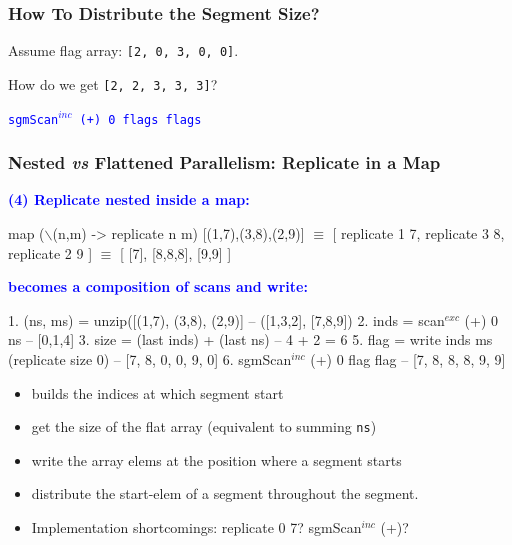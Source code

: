 \documentclass{beamer}
\newcommand{\blue}[1]{\textcolor{Blue}{{#1}}}
\renewcommand{\emph}[1]{\textcolor{structure}{#1}}
\newcommand{\emp}[1]{\textcolor{DikuRed}{ #1}}
\newcommand{\mymath}[1]{$ #1 $}
\newcommand{\myindu}[1]{^{#1}}
\begin{document}
\begin{frame}[fragile,t]
  \frametitle{How To Distribute the Segment Size?}

Assume flag array: \emph{\tt [2, 0, 3, 0, 0]}.

\bigskip

How do we get \emp{\tt [2, 2, 3, 3, 3]}?

\bigskip
\pause

\blue{\tt sgmScan\mymath{\myindu{inc}} (+) 0 flags flags}

\end{frame}


\begin{frame}[fragile,t]
  \frametitle{Nested {\it vs} Flattened Parallelism: Replicate in a Map}

\blue{\bf (4) Replicate nested inside a map:}

\begin{colorcode}[fontsize=\scriptsize]
map (\mymath{\backslash}(n,m) -> replicate n m) \emp{[(1,7),(3,8),(2,9)]} \mymath{\equiv}
[ replicate 1 7, replicate 3 8, replicate 2 9 ] \mymath{\equiv}
[ [7], [8,8,8], [9,9] ]
\end{colorcode}

\bigskip
\pause

\blue{\bf becomes a composition of scans and write:}
\bigskip

\begin{colorcode}[fontsize=\scriptsize]
1. (ns, ms)  = unzip([(1,7), (3,8), (2,9)]      -- ([1,3,2], [7,8,9])
2. inds = scan\mymath{\myindu{exc}} (+) 0 ns                       -- [0,1,4]
3. size = (last inds) + (last ns)               -- 4 + 2 = 6
5. flag = write inds  ms  (replicate size 0)    -- [7, 8, 0, 0, 9, 0]
6. sgmScan\mymath{\myindu{inc}} (+) 0 flag \emp{flag}                    \emph{-- [7, 8, 8, 8, 9, 9]}
\end{colorcode}

\bigskip

\begin{itemize}
    \item[2.] builds the indices at which segment start
    \item[3.] get the size of the flat array (equivalent to summing {\tt ns})
    \item[4-5.] write the array elems at the position where a segment starts
    \item[6.] distribute the start-elem of a segment throughout the segment. 
    \item \alert{Implementation shortcomings:} \pause replicate 0 7? \pause sgmScan\mymath{\myindu{inc}} (+)?
\end{itemize}

\end{frame}
\end{document}
